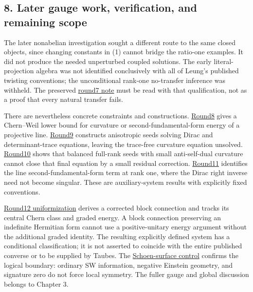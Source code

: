 \documentclass[
  english,
]{article}
\begin{document}
\hypertarget{later-gauge-work-verification-and-remaining-scope}{%
\subsection{8. Later gauge work, verification, and remaining
scope}\label{later-gauge-work-verification-and-remaining-scope}}

The later nonabelian investigation sought a different route to the same
closed objects, since changing constants in (1) cannot bridge the
ratio-one examples. It did not produce the needed unperturbed coupled
solutions. The early literal-projection algebra was not identified
conclusively with all of Leung's published twisting conventions; the
unconditional rank-one no-transfer inference was withheld. The preserved
\href{../proofs/round7_rigidity.md}{round7 note} must be read with that
qualification, not as a proof that every natural transfer fails.

There are nevertheless concrete constraints and constructions.
\href{../proofs/round8_nonabelian.md}{Round8} gives a Chern--Weil lower
bound for curvature or second-fundamental-form energy of a projective
line. \href{../proofs/round9_nonabelian.md}{Round9} constructs
anisotropic seeds solving Dirac and determinant-trace equations, leaving
the trace-free curvature equation unsolved.
\href{../proofs/round10_nonabelian.md}{Round10} shows that balanced
full-rank seeds with small anti-self-dual curvature cannot close that
final equation by a small residual correction.
\href{../proofs/round11_rankone.md}{Round11} identifies the line
second-fundamental-form term at rank one, where the Dirac right inverse
need not become singular. These are auxiliary-system results with
explicitly fixed conventions.

\href{../proofs/round12_uniformization.md}{Round12 uniformization}
derives a corrected block connection and tracks its central Chern class
and graded energy. A block connection preserving an indefinite Hermitian
form cannot use a positive-unitary energy argument without the
additional graded identity. The resulting explicitly defined system has
a conditional classification; it is not asserted to coincide with the
entire published converse or to be supplied by Taubes. The
\href{../proofs/round12_control.md}{Schoen-surface control} confirms the
logical boundary: ordinary SW information, negative Einstein geometry,
and signature zero do not force local symmetry. The fuller gauge and
global discussion belongs to Chapter 3.
\end{document}
